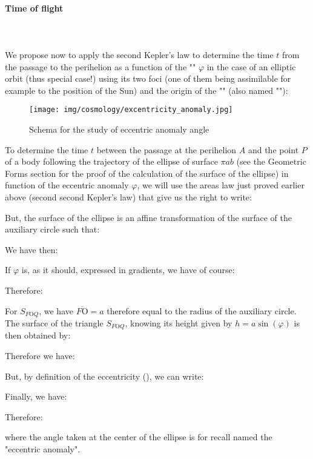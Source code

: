 	\paragraph{Time of flight}\mbox{}\\\\
	We propose now to apply the second Kepler's law to determine the time $t$ from the passage to the perihelion as a function of the "" $\varphi$ in the case of an elliptic orbit  (thus special case!) using its two foci (one of them being assimilable for example to the position of the Sun) and the origin of the "" (also named ""):
	\begin{figure}[H]
		\begin{center}
		\texttt{[image: img/cosmology/excentricity\_anomaly.jpg]}
		\end{center}	
		\caption{Schema for the study of eccentric anomaly angle}
	\end{figure}
	To determine the time $t$ between the passage at the perihelion $A$ and the point $P$ of a body following the trajectory of the ellipse of surface $\pi a b$ (see the Geometric Forms section for the proof of the calculation of the surface of the ellipse) in function of the eccentric anomaly $\varphi$, we will use the areas law just proved earlier above (second second Kepler's law) that give us the right to write:
	
	But, the surface of the ellipse is an affine transformation of the surface of the auxiliary circle such that:
	
 	We have then:
	
 	If $\varphi$ is, as it should, expressed in gradients, we have of course:
	
 	Therefore:
	
 	For $S_{F\text{O}Q}$, we have $\overline{F\text{O}}=a$ therefore equal to the radius of the auxiliary circle. The surface of the triangle $S_{F\text{O}Q}$, knowing its height given by $h=a\sin(\varphi)$ is then obtained by:
	
	Therefore we have:
	
	But, by definition of the eccentricity (), we can write:
	
	Finally, we have:
	
	Therefore:
	
 	where the angle taken at the center of the ellipse is for recall named the "eccentric anomaly".

